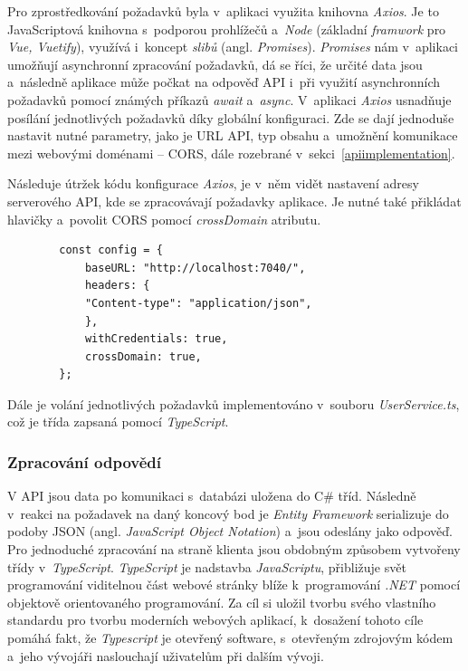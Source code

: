 Pro zprostředkování požadavků byla v~aplikaci využita knihovna \emph{Axios}. Je to JavaScriptová knihovna s~podporou prohlížečů a~\emph{Node} (základní \emph{framwork} pro \emph{Vue, Vuetify}), využívá i~koncept \emph{slibů} (angl. \emph{Promises}). \emph{Promises} nám v~aplikaci umožňují asynchronní zpracování požadavků, dá se říci, že určité data jsou  a~následně aplikace může počkat na odpověď API i~při využití asynchronních požadavků pomocí známých příkazů \emph{await}  a~\emph{async}. V~aplikaci \emph{Axios} usnadňuje posílání jednotlivých požadavků díky globální konfiguraci. Zde se dají jednoduše nastavit nutné parametry, jako je URL API, typ obsahu a~umožnění komunikace mezi webovými doménami -- CORS, dále rozebrané v~sekci~\ref{apiimplementation}.~\cite{axios}


Následuje útržek kódu konfigurace \emph{Axios}, je v~něm vidět nastavení adresy serverového API, kde se zpracovávají požadavky aplikace. Je nutné také přikládat hlavičky a~povolit CORS pomocí \emph{crossDomain} atributu. 
\begin{verbatim}
        const config = {
            baseURL: "http://localhost:7040/",
            headers: {
            "Content-type": "application/json",
            },
            withCredentials: true,
            crossDomain: true,
        };
\end{verbatim}
Dále je volání jednotlivých požadavků implementováno v~souboru \emph{UserService.ts}, což je třída zapsaná pomocí \emph{TypeScript}.

\subsubsection{Zpracování odpovědí}
V API jsou data po komunikaci s~databázi uložena do C\# tříd. Následně v~reakci na požadavek na daný koncový bod je \emph{Entity Framework} serializuje do podoby JSON (angl. \textit{JavaScript Object Notation}) a~jsou odeslány jako odpověď. Pro jednoduché zpracování na straně klienta jsou obdobným způsobem vytvořeny třídy v~\emph{TypeScript}. \emph{TypeScript} je nadstavba \emph{JavaScriptu}, přibližuje svět programování viditelnou část webové stránky blíže k~programování \emph{.NET} pomocí objektově orientovaného programování. Za cíl si uložil tvorbu svého vlastního standardu pro tvorbu moderních webových aplikací, k~dosažení tohoto cíle pomáhá fakt, že \emph{Typescript} je otevřený software, s~otevřeným zdrojovým kódem a~jeho vývojáři naslouchají uživatelům při dalším vývoji. \cite{typescript}

